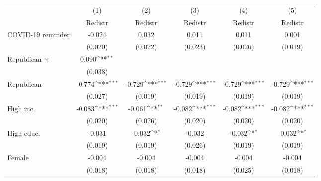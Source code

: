 {
\def\sym#1{\ifmmode^{#1}\else\(^{#1}\)\fi}
\begin{tabular}{l*{5}{c}}
\toprule
                    &\multicolumn{1}{c}{(1)}&\multicolumn{1}{c}{(2)}&\multicolumn{1}{c}{(3)}&\multicolumn{1}{c}{(4)}&\multicolumn{1}{c}{(5)}\\
                    &\multicolumn{1}{c}{Redistr}&\multicolumn{1}{c}{Redistr}&\multicolumn{1}{c}{Redistr}&\multicolumn{1}{c}{Redistr}&\multicolumn{1}{c}{Redistr}\\
\midrule
COVID-19 reminder   &      -0.024         &       0.032         &       0.011         &       0.011         &       0.001         \\
                    &     (0.020)         &     (0.022)         &     (0.023)         &     (0.026)         &     (0.019)         \\
\addlinespace
Republican $\times$ &       0.090\sym{**} &                     &                     &                     &                     \\
                    &     (0.038)         &                     &                     &                     &                     \\
\addlinespace
Republican          &      -0.774\sym{***}&      -0.729\sym{***}&      -0.729\sym{***}&      -0.729\sym{***}&      -0.729\sym{***}\\
                    &     (0.027)         &     (0.019)         &     (0.019)         &     (0.019)         &     (0.019)         \\
\addlinespace
High inc.           &      -0.083\sym{***}&      -0.061\sym{**} &      -0.082\sym{***}&      -0.082\sym{***}&      -0.082\sym{***}\\
                    &     (0.020)         &     (0.026)         &     (0.020)         &     (0.020)         &     (0.020)         \\
\addlinespace
High educ.          &      -0.031         &      -0.032\sym{*}  &      -0.032         &      -0.032\sym{*}  &      -0.032\sym{*}  \\
                    &     (0.019)         &     (0.019)         &     (0.026)         &     (0.019)         &     (0.019)         \\
\addlinespace
Female              &      -0.004         &      -0.004         &      -0.004         &      -0.004         &      -0.004         \\
                    &     (0.018)         &     (0.018)         &     (0.018)         &     (0.025)         &     (0.018)         \\

\end{tabular}}
